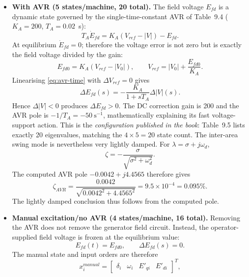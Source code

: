 \documentclass[12pt,a4paper]{article}
\begin{document}
\begin{itemize}
  \item \textbf{With AVR (5 states/machine, 20 total).} The field voltage
  $E_{fd}$ is a dynamic state governed by the single-time-constant AVR of
  Table~9.4 ($K_A=200$, $T_A=0.02$~s):
  \begin{equation}
  T_A\dot E_{fd}=K_A(V_{ref}-|V|)-E_{fd}.
  \label{eq:avr-time}
  \end{equation}
  At equilibrium $\dot E_{fd}=0$; therefore the voltage error is not zero but
  is exactly the field voltage divided by the gain:
  \begin{equation}
  E_{fd0}=K_A(V_{ref}-|V_0|),\qquad
  V_{ref}=|V_0|+\frac{E_{fd0}}{K_A}.
  \label{eq:avr-equilibrium}
  \end{equation}
  Linearising \eqref{eq:avr-time} with $\Delta V_{ref}=0$ gives
  \begin{equation}
  \Delta E_{fd}(s)=-\frac{K_A}{1+sT_A}\Delta|V|(s).
  \label{eq:avr-transfer}
  \end{equation}
  Hence $\Delta|V|<0$ produces $\Delta E_{fd}>0$. The DC correction gain is
  200 and the AVR pole is $-1/T_A=-50~\mathrm{s}^{-1}$, mathematically
  explaining its fast voltage-support action. This is the
  \emph{configuration published in the book}: Table~9.5 lists exactly 20
  eigenvalues, matching the $4\times5=20$ state count. The inter-area swing
  mode is nevertheless very lightly damped. For
  $\lambda=\sigma+j\omega_d$,
  \begin{equation}
  \zeta=-\frac{\sigma}{\sqrt{\sigma^2+\omega_d^2}}.
  \label{eq:damping-ratio}
  \end{equation}
  The computed AVR pole $-0.0042+j4.4565$ therefore gives
  \begin{equation}
  \zeta_{AVR}=\frac{0.0042}{\sqrt{0.0042^2+4.4565^2}}
  =9.5\times10^{-4}=0.095\%.
  \end{equation}
  The lightly damped conclusion thus follows from the computed pole.
  \item \textbf{Manual excitation/no AVR (4 states/machine, 16 total).}
  Removing the AVR does not remove the generator field circuit. Instead, the
  operator-supplied field voltage is frozen at the equilibrium value:
  \begin{equation}
  E_{fd}(t)=E_{fd0},\qquad \Delta E_{fd}(s)=0.
  \label{eq:manual-field}
  \end{equation}
  The manual state and input orders are therefore
  \begin{equation}
  x_i^{manual}=
  \begin{bmatrix}\delta_i&\omega_i&E'_{qi}&E'_{di}\end{bmatrix}^{T},

\end{equation}
\end{itemize}
\end{document}
